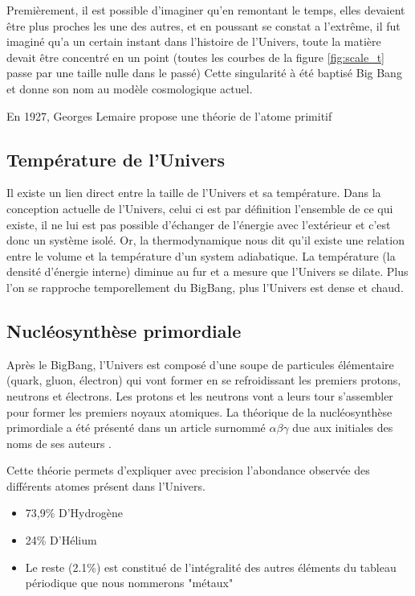 Premièrement, il est possible d'imaginer qu'en remontant le temps, elles devaient être plus proches les une des autres, et en poussant se constat a l’extrême, il fut imaginé qu'a un certain instant dans l'histoire de l'Univers, toute la matière devait être concentré en un point (toutes les courbes de la figure \ref{fig:scale_t} passe par une taille nulle dans le passé)
Cette singularité à été baptisé Big Bang et donne son nom au modèle cosmologique actuel.

En 1927, Georges Lemaire propose une théorie de l'atome primitif \cite{1927ASSB...47...49L} 


\subsection{Température de l'Univers}

Il existe un lien direct entre la taille de l'Univers et sa température.
Dans la conception actuelle de l'Univers, celui ci est par définition l'ensemble de ce qui existe, il ne lui est pas possible d'échanger de l’énergie avec l’extérieur et c'est donc un système isolé.
Or, la thermodynamique nous dit qu'il existe une relation entre le volume et la température d'un system adiabatique.
La température (la densité d'énergie interne) diminue au fur et a mesure que l'Univers se dilate.
Plus l'on se rapproche temporellement du BigBang, plus l'Univers est dense et chaud.


\subsection{Nucléosynthèse primordiale}
\label{sec:nucleosynthese_primordiale}
Après le BigBang, l'Univers est composé d'une soupe de particules élémentaire (quark, gluon, électron) qui vont former en se refroidissant les premiers protons, neutrons et électrons.
Les protons et les neutrons vont a leurs tour s'assembler pour former les premiers noyaux atomiques.
La théorique de la nucléosynthèse primordiale a été présenté dans un article surnommé $\alpha \beta \gamma$ due aux initiales des noms de ses auteurs \citep{PhysRev.73.803}.

Cette théorie permets d'expliquer avec precision l'abondance observée des différents atomes présent dans l'Univers.

\begin{itemize}
\item 73,9\% D’Hydrogène
\item 24\% D’Hélium
\item Le reste (2.1\%) est constitué de l'intégralité des autres éléments du tableau périodique que nous nommerons "métaux"
\end{itemize}

